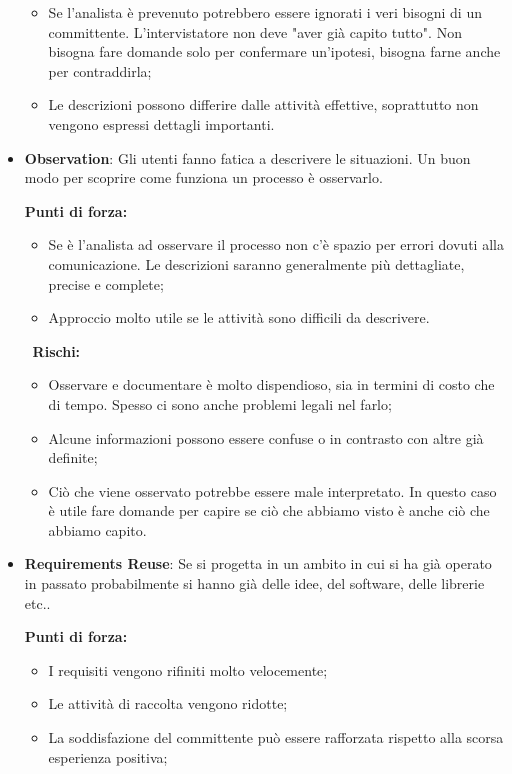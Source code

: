 \begin{itemize}
\begin{info}[]
\begin{itemize}
			\item Se l'analista è prevenuto potrebbero essere ignorati i veri bisogni di un committente. L'intervistatore non deve "aver già capito tutto". Non bisogna fare domande solo per confermare un'ipotesi, bisogna farne anche per contraddirla;
			\item Le descrizioni possono differire dalle attività effettive, soprattutto non vengono espressi dettagli importanti.
		\end{itemize}
	\end{info}
	\item \textbf{Observation}: Gli utenti fanno fatica a descrivere le situazioni. Un buon modo per scoprire come funziona un processo è osservarlo.
	\begin{info}[]
		\textbf{Punti di forza:}
		\begin{itemize}
			\item Se è l'analista ad osservare il processo non c'è spazio per errori dovuti alla comunicazione. Le descrizioni saranno generalmente più dettagliate, precise e complete;
			\item Approccio molto utile se le attività sono difficili da descrivere.
		\end{itemize}
		$\;\;$\textbf{Rischi:}
		\begin{itemize}
			\item Osservare e documentare è molto dispendioso, sia in termini di costo che di tempo. Spesso ci sono anche problemi legali nel farlo;
			\item Alcune informazioni possono essere confuse o in contrasto con altre già definite;
			\item Ciò che viene osservato potrebbe essere male interpretato. In questo caso è utile fare domande per capire se ciò che abbiamo visto è anche ciò che abbiamo capito.
		\end{itemize}
	\end{info}
	\item \textbf{Requirements Reuse}: Se si progetta in un ambito in cui si ha già operato in passato probabilmente si hanno già delle idee, del software, delle librerie etc..
	\begin{info}[]
		\textbf{Punti di forza:}
		\begin{itemize}
			\item I requisiti vengono rifiniti molto velocemente;
			\item Le attività di raccolta vengono ridotte;
			\item La soddisfazione del committente può essere rafforzata rispetto alla scorsa esperienza positiva;

\end{itemize}
\end{info}
\end{itemize}

